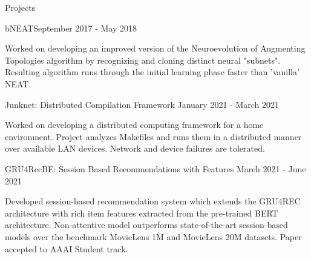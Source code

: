 \documentclass{resume} %
\begin{document}
\begin{resumeSection}{Projects} \itemsep -10pt

\begin{resumeSubsection}{bNEAT}{September 2017 - May 2018}{}{}
\item Worked on developing an improved version of the Neuroevolution of
	Augmenting Topologies algorithm by recognizing and cloning distinct
	neural "subnets". Resulting algorithm runs through the initial learning
	phase faster than 'vanilla' NEAT.
\end{resumeSubsection}
\begin{resumeSubsection}{Junknet: Distributed Compilation Framework}
	{January 2021 - March 2021}{}{}
\item Worked on developing a distributed computing framework for a home
	environment. Project analyzes Makefiles and runs them in a distributed
	manner over available LAN devices. Network and device failures are
	tolerated.
\end{resumeSubsection}
\begin{resumeSubsection}{GRU4RecBE: Session Based Recommendations with Features}
	{March 2021 - June 2021}{}{}
\item Developed session-based recommendation system which extends the GRU4REC
	architecture with rich item features extracted from the pre-trained
	BERT architecture. Non-attentive model outperforms state-of-the-art
	session-based models over the benchmark MovieLens 1M and MovieLens 20M
	datasets. Paper accepted to AAAI Student track. 
\end{resumeSubsection}

\end{resumeSection}
\end{document}
